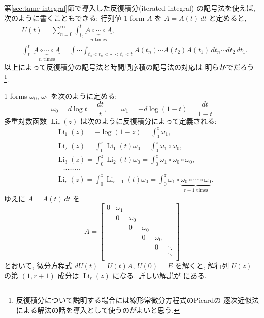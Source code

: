 \documentclass[12pt,twoside]{jarticle}
\theoremstyle{definition} %
\theoremstyle{definition} %
\theoremstyle{definition} %
\numberwithin{theorem}{section}
\numberwithin{equation}{section}
\numberwithin{figure}{section}
\numberwithin{table}{section}
\newcommand\secref[1]{第\ref{#1}節}
\newcommand\Li{\operatorname{Li}}
\begin{document}
\secref{sec:tame-integral}で導入した反復積分(iterated integral)
の記号法を使えば, 次のように書くこともできる:
行列値 1-form $A$ を $A = A(t)\,dt$ と定めると,
\begin{align*}
&
U(t)
= \sum_{n=0}^\infty
\int_{t_0}^t \underbrace{A\circ\cdots\circ A}_{\text{$n$ times}},
\\ &
\int_{t_0}^t \underbrace{A\circ\cdots\circ A}_{\text{$n$ times}}
=
\int\!\cdots\!\int_{t_0<t_n<\cdots<t_1<t}
A(t_n)\cdots A(t_2)A(t_1) \,dt_n\cdots dt_2\,dt_1.
\end{align*}
以上によって反復積分の記号法と時間順序積の記号法の対応は
明らかでだろう%
\footnote{反復積分について説明する場合には線形常微分方程式のPicardの
逐次近似法による解法の話を導入として使うのがよいと思う.}.


1-forms $\omega_0$, $\omega_1$ を次のように定める:
\[
\omega_0 = d\log t = \frac{dt}{t}, \qquad
\omega_1 = -d\log(1-t) = \frac{dt}{1-t}
\]
多重対数函数 $\Li_r(z)$ は次のように反復積分によって定義される:
\begin{align*}
&
\Li_1(z) = -\log(1-z) = \int_0^z \omega_1,
\\ &
\Li_2(z) = \int_0^z \Li_1(t)\omega_0 = \int_0^z \omega_1\circ\omega_0,
\\ &
\Li_3(z) = \int_0^z \Li_2(t)\omega_0 = \int_0^z \omega_1\circ\omega_0\circ\omega_0,
\\ &
\quad \cdots\cdots\cdots
\\ &
\Li_r(z) = \int_0^z \Li_{r-1}(t)\omega_0
= \int_0^z \omega_1\circ
\underbrace{\omega_0\circ\cdots\circ\omega_0}_{\text{$r-1$ times}}.
\end{align*}
ゆえに $A=A(t)\,dt$ を
\[
A =
\begin{bmatrix}
0 & \omega_1 &          &          &          & \\
  & 0        & \omega_0 &          &          & \\
  &          & 0        & \omega_0 &          & \\
  &          &          & 0        & \omega_0 & \\
  &          &          &          & 0        & \ddots \\
  &          &          &          &          & \ddots \\
\end{bmatrix}
\]
とおいて, 微分方程式 $dU(t)=U(t)A$, $U(0)=E$ を解くと,
解行列 $U(z)$ の第 $(1,r+1)$ 成分は $\Li_r(z)$ になる.
詳しい解説が \cite{hain} にある.

\end{document}
